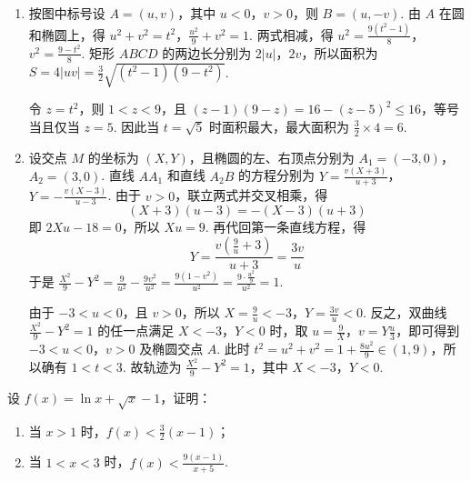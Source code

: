 \begin{solution}
\begin{enumerate}
\item 按图中标号设 \(A=(u,v)\)，其中 \(u<0\)，\(v>0\)，则 \(B=(u,-v)\). 由 \(A\) 在圆和椭圆上，得
\(u^2+v^2=t^2\)，\(\displaystyle\frac{u^2}{9}+v^2=1\). 两式相减，得 \(\displaystyle u^2=\frac{9(t^2-1)}{8}\)，\(\displaystyle v^2=\frac{9-t^2}{8}\). 矩形 \(ABCD\) 的两边长分别为 \(2|u|\)，\(2v\)，所以面积为
\(\displaystyle S=4|uv|=\frac{3}{2}\sqrt{(t^2-1)(9-t^2)}\).

令 \(z=t^2\)，则 \(1<z<9\)，且 \((z-1)(9-z)=16-(z-5)^2\leqslant16\)，等号当且仅当 \(z=5\). 因此当 \(t=\sqrt{5}\) 时面积最大，最大面积为 \(\displaystyle\frac{3}{2}\times4=6\).
\item 设交点 \(M\) 的坐标为 \((X,Y)\)，且椭圆的左、右顶点分别为 \(A_1=(-3,0)\)，\(A_2=(3,0)\). 直线 \(AA_1\) 和直线 \(A_2B\) 的方程分别为
\(\displaystyle Y=\frac{v(X+3)}{u+3}\)，\(\displaystyle Y=-\frac{v(X-3)}{u-3}\). 由于 \(v>0\)，联立两式并交叉相乘，得
\[
(X+3)(u-3)=-(X-3)(u+3)
\]
即 \(2Xu-18=0\)，所以 \(Xu=9\). 再代回第一条直线方程，得
\[
Y=\frac{v(\frac{9}{u}+3)}{u+3}=\frac{3v}{u}
\]
于是
\(\displaystyle\frac{X^2}{9}-Y^2=\frac{9}{u^2}-\frac{9v^2}{u^2}=\frac{9(1-v^2)}{u^2}=\frac{9\cdot \frac{u^2}{9}}{u^2}=1\).

由于 \(-3<u<0\)，且 \(v>0\)，所以 \(X=\frac{9}{u}<-3\)，\(Y=\frac{3v}{u}<0\). 反之，双曲线 \(\frac{X^2}{9}-Y^2=1\) 的任一点满足 \(X<-3\)，\(Y<0\) 时，取 \(u=\frac{9}{X}\)，\(v=Y\frac{u}{3}\)，即可得到 \(-3<u<0\)，\(v>0\) 及椭圆交点 \(A\). 此时
\(t^2=u^2+v^2=1+\frac{8u^2}{9}\in(1,9)\)，所以确有 \(1<t<3\). 故轨迹为 \(\displaystyle\frac{X^2}{9}-Y^2=1\)，其中 \(X<-3\)，\(Y<0\).
\end{enumerate}
\end{solution}

\begin{problem}
设 \( f(x) = \ln x + \sqrt{x} - 1\)，证明：
\begin{enumerate}
\item 当 \(x > 1\) 时，\(f(x) < \frac{3}{2}(x - 1)\)；
\item 当 \(1 < x < 3\) 时，\(f(x) < \frac{9(x - 1)}{x + 5}\).
\end{enumerate}
\end{problem}

